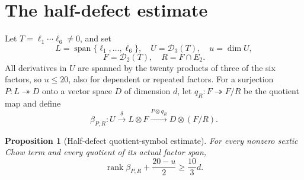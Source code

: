 \documentclass[11pt]{amsart}
\newcommand{\Span}{\operatorname{span}}
\newcommand{\rank}{\operatorname{rank}}
\newcommand{\cD}{\mathcal{D}}
\newtheorem{proposition}[theorem]{Proposition}
\theoremstyle{definition}
\begin{document}
\section{The half-defect estimate}\label{sec:half-defect}

Let \(T=\ell_1\cdots\ell_6\ne0\), and set
\[
 L=\Span\{\ell_1,\ldots,\ell_6\},\quad
 U=\cD_3(T),\quad u=\dim U,
\]
\[
 F=\cD_2(T),\quad R=F\cap E_2.
\]
All derivatives in \(U\) are spanned by the twenty products of three
of the six factors, so \(u\le20\), also for dependent or repeated factors.
For a surjection \(P:L\twoheadrightarrow D\) onto a vector space \(D\) of
dimension \(d\), let
\(q_R:F\twoheadrightarrow F/R\) be the quotient map and define
\[
 \beta_{P,R}:U\xrightarrow{\delta}L\otimes F
 \xrightarrow{P\otimes q_R}D\otimes(F/R).
\]

\begin{proposition}[Half-defect quotient-symbol estimate]
\label{prop:half-defect}
For every nonzero sextic Chow term and every quotient of its actual factor
span,
\[
 \boxed{\rank\beta_{P,R}+\frac{20-u}{2}\ge\frac{10}{3}d.} \tag{5.1}
\]
\end{proposition}
\end{document}
